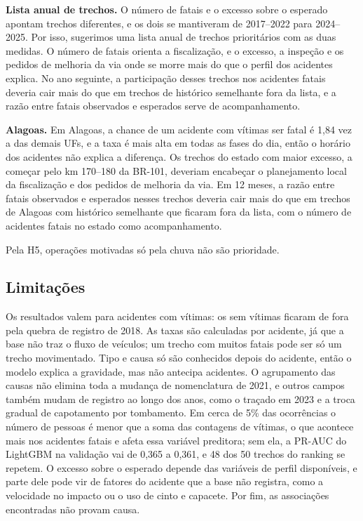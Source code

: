 \documentclass[12pt]{article}
\begin{document}
\textbf{Lista anual de trechos.} O número de fatais e o excesso sobre o esperado apontam trechos diferentes, e os dois se mantiveram de 2017--2022 para 2024--2025. Por isso, sugerimos uma lista anual de trechos prioritários com as duas medidas. O número de fatais orienta a fiscalização, e o excesso, a inspeção e os pedidos de melhoria da via onde se morre mais do que o perfil dos acidentes explica. No ano seguinte, a participação desses trechos nos acidentes fatais deveria cair mais do que em trechos de histórico semelhante fora da lista, e a razão entre fatais observados e esperados serve de acompanhamento.

\textbf{Alagoas.} Em Alagoas, a chance de um acidente com vítimas ser fatal é 1,84 vez a das demais UFs, e a taxa é mais alta em todas as fases do dia, então o horário dos acidentes não explica a diferença. Os trechos do estado com maior excesso, a começar pelo km 170--180 da BR-101, deveriam encabeçar o planejamento local da fiscalização e dos pedidos de melhoria da via. Em 12 meses, a razão entre fatais observados e esperados nesses trechos deveria cair mais do que em trechos de Alagoas com histórico semelhante que ficaram fora da lista, com o número de acidentes fatais no estado como acompanhamento.

Pela H5, operações motivadas só pela chuva não são prioridade.

\subsection{Limitações}
\label{sec:limitacoes}

Os resultados valem para acidentes com vítimas: os sem vítimas ficaram de fora pela quebra de registro de 2018. As taxas são calculadas por acidente, já que a base não traz o fluxo de veículos; um trecho com muitos fatais pode ser só um trecho movimentado. Tipo e causa só são conhecidos depois do acidente, então o modelo explica a gravidade, mas não antecipa acidentes. O agrupamento das causas não elimina toda a mudança de nomenclatura de 2021, e outros campos também mudam de registro ao longo dos anos, como o traçado em 2023 e a troca gradual de capotamento por tombamento. Em cerca de 5\% das ocorrências o número de pessoas é menor que a soma das contagens de vítimas, o que acontece mais nos acidentes fatais e afeta essa variável preditora; sem ela, a PR-AUC do LightGBM na validação vai de 0,365 a 0,361, e 48 dos 50 trechos do ranking se repetem. O excesso sobre o esperado depende das variáveis de perfil disponíveis, e parte dele pode vir de fatores do acidente que a base não registra, como a velocidade no impacto ou o uso de cinto e capacete. Por fim, as associações encontradas não provam causa.
\end{document}
